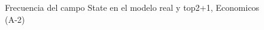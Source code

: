 \begin{figure}[H]
    \centering
    
    \caption{Frecuencia del campo State en el modelo real y top2+1, Economicos (A-2)}
    \label{frecuency-State-top2+1}
\end{figure}